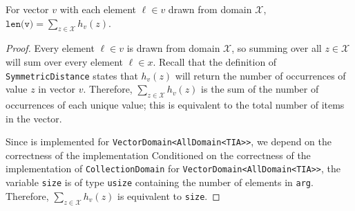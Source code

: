 \documentclass{article}
\begin{document}
\begin{lemma}
    \label{lemma:len-sum-equiv}
    For vector $v$ with each element $\ell\in v$ drawn from domain $\mathcal{X}$, $\texttt{len(v)} = \sum_{z\in\mathcal{X}} h_v(z)$.
\end{lemma}

\begin{proof}
    Every element $\ell \in v$ is drawn from domain $\mathcal{X}$, so summing over all $z\in \mathcal{X}$ will sum over every element $\ell\in x$. 
    Recall that the definition of \texttt{SymmetricDistance} states that $h_v(z)$ will return the number of occurrences of value $z$ in vector $v$.
    Therefore, $\sum_{z\in\mathcal{X}} h_v(z)$ is the sum of the number of occurrences of each unique value; 
    this is equivalent to the total number of items in the vector. 

    Since  is implemented for \texttt{VectorDomain<AllDomain<TIA>>}, 
    we depend on the correctness of the implementation 
    Conditioned on the correctness of the implementation of \texttt{CollectionDomain} for \texttt{VectorDomain<AllDomain<TIA>>},
    the variable \texttt{size} is of type \texttt{usize} containing the number of elements in \texttt{arg}.
    Therefore, $\sum_{z\in\mathcal{X}} h_v(z)$ is equivalent to \texttt{size}.
\end{proof}
\end{document}
